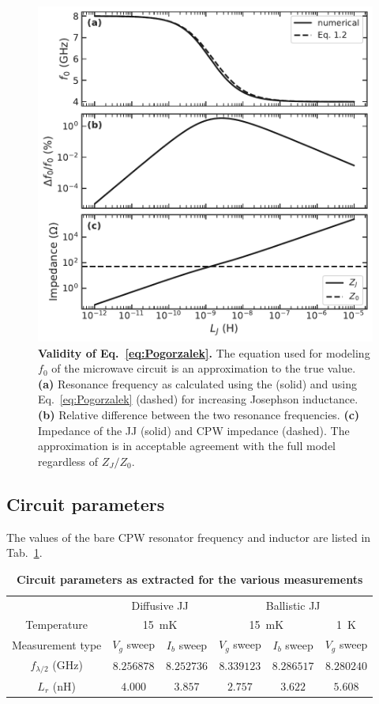 \begin{figure}
	\centering
	\includegraphics[width=0.5\linewidth]{chapter-gJJ-CPR/figs/SMFigure-validity}
	\caption{
		\textbf{Validity of Eq.~\ref{eq:Pogorzalek}.}
		The equation used for modeling $f_0$ of the microwave circuit is an approximation to the true value.
		\textbf{(a)} Resonance frequency as calculated using the  (solid) and using Eq.~\ref{eq:Pogorzalek} (dashed) for increasing Josephson inductance.
		\textbf{(b)} Relative difference between the two resonance frequencies.
		\textbf{(c)} Impedance of the JJ (solid) and CPW impedance (dashed).
		The approximation is in acceptable agreement with the full model regardless of $Z_J/Z_0$.
	}
	\label{fig:SMval}
\end{figure}


\subsection{Circuit parameters}

The values of the bare CPW resonator frequency and inductor are listed in Tab.~\ref{tab:frLr}.

\begin{table}[!h]
	\centering
	\caption{\textbf{Circuit parameters as extracted for the various measurements}}
	\begin{tabular}{|c|c|c|c|c|c|}
		\hline\hline
		& \multicolumn{2}{c|}{Diffusive JJ} & \multicolumn{3}{c|}{Ballistic JJ}  \\
		Temperature & \multicolumn{2}{c|}{\SI{15}{\milli\kelvin}} & \multicolumn{2}{c|}{\SI{15}{\milli\kelvin}} & \SI{1}{\kelvin} \\
		Measurement type & $V_g$ sweep & $I_b$ sweep & $V_g$ sweep & $I_b$ sweep & $V_g$ sweep \\
		\hline
		$f_{\lambda/2}$ (\si{\giga\hertz}) & $8.256878$ & $8.252736$ & $8.339123$ & $8.286517$  & $8.280240$ \\
		$L_r$ (\si{\nano\henry}) & $4.000$ & $3.857$ & $2.757$ & $3.622$ & $5.608$ \\
		\hline\hline
	\end{tabular}
	\label{tab:frLr}
\end{table}

